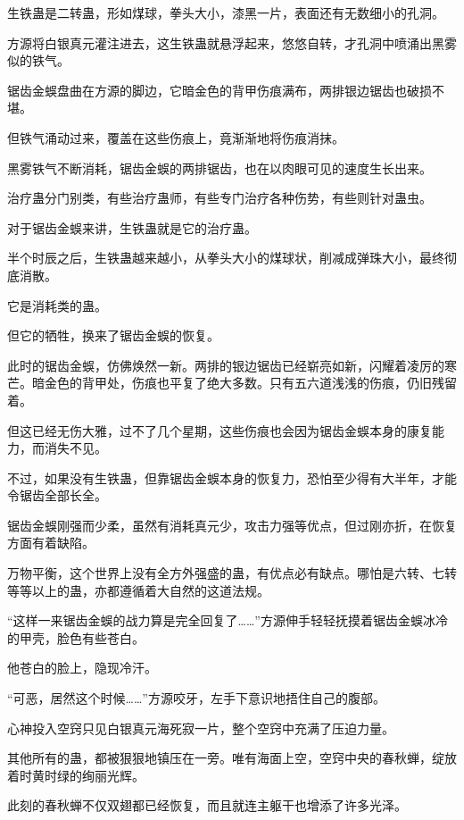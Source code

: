
\begin{this_body}

生铁蛊是二转蛊，形如煤球，拳头大小，漆黑一片，表面还有无数细小的孔洞。

方源将白银真元灌注进去，这生铁蛊就悬浮起来，悠悠自转，才孔洞中喷涌出黑雾似的铁气。

锯齿金蜈盘曲在方源的脚边，它暗金色的背甲伤痕满布，两排银边锯齿也破损不堪。

但铁气涌动过来，覆盖在这些伤痕上，竟渐渐地将伤痕消抹。

黑雾铁气不断消耗，锯齿金蜈的两排锯齿，也在以肉眼可见的速度生长出来。

治疗蛊分门别类，有些治疗蛊师，有些专门治疗各种伤势，有些则针对蛊虫。

对于锯齿金蜈来讲，生铁蛊就是它的治疗蛊。

半个时辰之后，生铁蛊越来越小，从拳头大小的煤球状，削减成弹珠大小，最终彻底消散。

它是消耗类的蛊。

但它的牺牲，换来了锯齿金蜈的恢复。

此时的锯齿金蜈，仿佛焕然一新。两排的银边锯齿已经崭亮如新，闪耀着凌厉的寒芒。暗金色的背甲处，伤痕也平复了绝大多数。只有五六道浅浅的伤痕，仍旧残留着。

但这已经无伤大雅，过不了几个星期，这些伤痕也会因为锯齿金蜈本身的康复能力，而消失不见。

不过，如果没有生铁蛊，但靠锯齿金蜈本身的恢复力，恐怕至少得有大半年，才能令锯齿全部长全。

锯齿金蜈刚强而少柔，虽然有消耗真元少，攻击力强等优点，但过刚亦折，在恢复方面有着缺陷。

万物平衡，这个世界上没有全方外强盛的蛊，有优点必有缺点。哪怕是六转、七转等等以上的蛊，亦都遵循着大自然的这道法规。

“这样一来锯齿金蜈的战力算是完全回复了……”方源伸手轻轻抚摸着锯齿金蜈冰冷的甲壳，脸色有些苍白。

他苍白的脸上，隐现冷汗。

“可恶，居然这个时候……”方源咬牙，左手下意识地捂住自己的腹部。

心神投入空窍只见白银真元海死寂一片，整个空窍中充满了压迫力量。

其他所有的蛊，都被狠狠地镇压在一旁。唯有海面上空，空窍中央的春秋蝉，绽放着时黄时绿的绚丽光辉。

此刻的春秋蝉不仅双翅都已经恢复，而且就连主躯干也增添了许多光泽。


\end{this_body}
